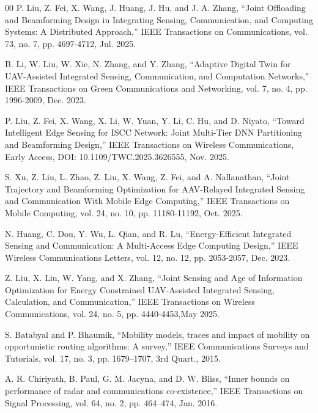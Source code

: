 \documentclass[10pt,journal,compsoc]{IEEEtran}
\begin{document}
\begin{thebibliography}{00}
P. Liu, Z. Fei, X. Wang, J. Huang, J. Hu, and J. A. Zhang,
``Joint Offloading and Beamforming Design in Integrating Sensing, Communication, and Computing Systems: A Distributed Approach,''
IEEE Transactions on Communications, vol. 73, no. 7, pp. 4697-4712, Jul. 2025.

B. Li, W. Liu, W. Xie, N. Zhang, and Y. Zhang,
``Adaptive Digital Twin for UAV-Assisted Integrated Sensing, Communication, and Computation Networks,''
IEEE Transactions on Green Communications and Networking, vol. 7, no. 4, pp. 1996-2009, Dec. 2023.

P. Liu, Z. Fei, X. Wang, X. Li, W. Yuan, Y. Li, C. Hu, and D. Niyato,
``Toward Intelligent Edge Sensing for ISCC Network: Joint Multi-Tier DNN Partitioning and Beamforming Design,''	
IEEE Transactions on Wireless Communications, Early Access, DOI: 10.1109/TWC.2025.3626555, Nov. 2025.

S. Xu, Z. Liu, L. Zhao, Z. Liu, X. Wang, Z. Fei, and A. Nallanathan,
``Joint Trajectory and Beamforming Optimization for AAV-Relayed Integrated Sensing and Communication With Mobile Edge Computing,''
IEEE Transactions on Mobile Computing, vol. 24, no. 10, pp. 11180-11192, Oct. 2025.

N. Huang, C. Dou, Y. Wu, L. Qian, and R. Lu,
``Energy-Efficient Integrated Sensing and Communication: A Multi-Access Edge Computing Design,''
IEEE Wireless Communications Letters, vol. 12, no. 12, pp. 2053-2057, Dec. 2023.

Z. Liu, X. Liu, W. Yang, and X. Zhang,
``Joint Sensing and Age of Information Optimization for Energy Constrained UAV-Assisted Integrated Sensing, Calculation, and Communication,''
IEEE Transactions on Wireless Communications, vol. 24, no. 5, pp. 4440-4453,May 2025.

S. Batabyal and P. Bhaumik, ``Mobility models, traces and impact of mobility on opportunistic routing algorithms: A survey,'' IEEE Communications Surveys and Tutorials, vol. 17, no. 3, pp. 1679–1707, 3rd Quart., 2015.

A. R. Chiriyath, B. Paul, G. M. Jacyna, and D. W. Bliss, ``Inner bounds on performance of radar and communications co-existence,'' IEEE Transactions on Signal Processing, vol. 64, no. 2, pp. 464–474, Jan. 2016.


\end{thebibliography}
\end{document}
